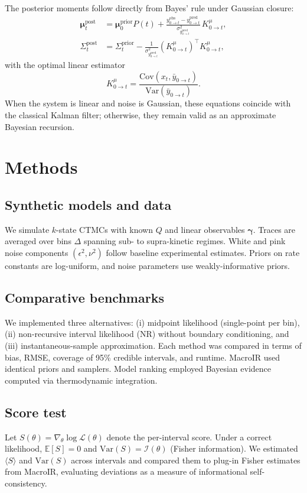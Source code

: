 \documentclass[9pt]{elife}
\begin{document}
	The posterior moments follow directly from Bayes’ rule under Gaussian closure:
	\begin{align}
		\bm{\mu}^{\mathrm{post}}_{t} &=
		\bm{\mu}^{\mathrm{prior}}_0 P(t)
		+ \frac{y^{\mathrm{obs}}_{0\to t}-y^{\mathrm{pred}}_{0\to t}}{\sigma^2_{y^{\mathrm{pred}}_{0\to t}}}\,K^\mu_{0\to t},\\
		\Sigma^{\mathrm{post}}_{t} &=
		\Sigma^{\mathrm{prior}}_{t}
		- \frac{1}{\sigma^2_{y^{\mathrm{pred}}_{0\to t}}}
		(K^\mu_{0\to t})^\top K^\mu_{0\to t},
	\end{align}
	with the optimal linear estimator
	\[
	K^\mu_{0\to t} = \frac{\mathrm{Cov}(x_t,\bar y_{0\to t})}{\mathrm{Var}(\bar y_{0\to t})}.
	\]
	When the system is linear and noise is Gaussian, these equations coincide with the classical Kalman filter; otherwise, they remain valid as an approximate Bayesian recursion.
	
	\section*{Methods}
	
	\subsection*{Synthetic models and data}
	We simulate $k$-state CTMCs with known $Q$ and linear observables $\bm{\gamma}$. 
	Traces are averaged over bins $\Delta$ spanning sub- to supra-kinetic regimes. 
	White and pink noise components $(\epsilon^2,\nu^2)$ follow baseline experimental estimates. 
	Priors on rate constants are log-uniform, and noise parameters use weakly-informative priors.
	
	\subsection*{Comparative benchmarks}
	We implemented three alternatives: (i) midpoint likelihood (single-point per bin), (ii) non-recursive interval likelihood (NR) without boundary conditioning, and (iii) instantaneous-sample approximation. 
	Each method was compared in terms of bias, RMSE, coverage of 95\% credible intervals, and runtime. 
	MacroIR used identical priors and samplers. 
	Model ranking employed Bayesian evidence computed via thermodynamic integration.
	
	\subsection*{Score test}
	Let $S(\theta)=\nabla_\theta \log \mathcal{L}(\theta)$ denote the per-interval score. 
	Under a correct likelihood, $\mathbb{E}[S]=0$ and $\mathrm{Var}(S)=\mathcal{I}(\theta)$ (Fisher information). 
	We estimated $\langle S\rangle$ and $\mathrm{Var}(S)$ across intervals and compared them to plug-in Fisher estimates from MacroIR, evaluating deviations as a measure of informational self-consistency.
	
\end{document}
